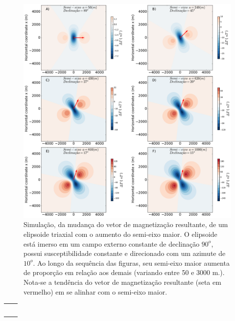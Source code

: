 \begin{figure}[hbt!]
	\centering \includegraphics[width=16 cm,height=16 cm]{figures/ellipsoid_shape_iso}
	\caption[Simulação, da mudança do vetor de magnetização resultante, de um elipsoide triaxial com o aumento do semi-eixo maior.]{Simulação, da mudança do vetor de magnetização resultante, de um elipsoide triaxial com o aumento do semi-eixo maior. O elipsoide está imerso em um campo externo constante de declinação $90^o$, possui susceptibilidade constante e direcionado com um azimute de $10^o$. Ao longo da sequência das figuras, seu semi-eixo maior aumenta de proporção em relação aos demais (variando entre 50 e 3000 m.). Nota-se a tendência do vetor de magnetização resultante (seta em vermelho) em se alinhar com o semi-eixo maior.}
	\label{fig:ellipsoid_shape_iso10}
\end{figure}

\begin{table}[h!]
	\begin{center}
		\begin{tabular}{lc}
			
			& \\
			& \\
			& \\
			& \\
			& \\
			
		\end{tabular}
	\end{center}
\end{table}

